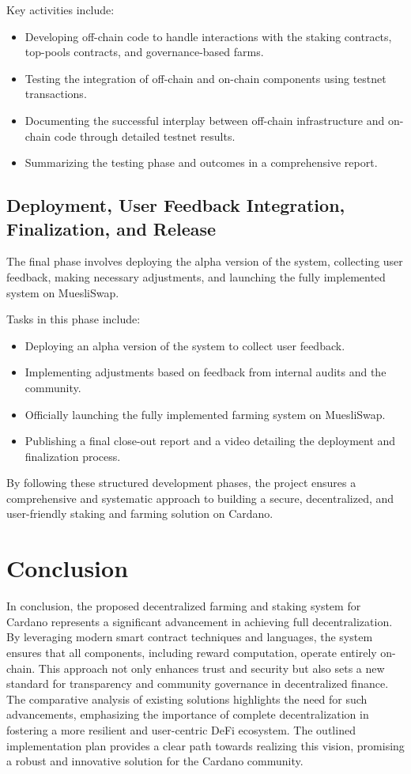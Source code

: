 \documentclass[12pt,parskip=full, tikz]{article}
\begin{document}
Key activities include:
\begin{itemize}
    \item Developing off-chain code to handle interactions with the staking contracts, top-pools contracts, and governance-based farms.
    \item Testing the integration of off-chain and on-chain components using testnet transactions.
    \item Documenting the successful interplay between off-chain infrastructure and on-chain code through detailed testnet results.
    \item Summarizing the testing phase and outcomes in a comprehensive report.
\end{itemize}

\subsection{Deployment, User Feedback Integration, Finalization, and Release}
The final phase involves deploying the alpha version of the system, collecting user feedback, making necessary adjustments, and launching the fully implemented system on MuesliSwap.

Tasks in this phase include:
\begin{itemize}
    \item Deploying an alpha version of the system to collect user feedback.
    \item Implementing adjustments based on feedback from internal audits and the community.
    \item Officially launching the fully implemented farming system on MuesliSwap.
    \item Publishing a final close-out report and a video detailing the deployment and finalization process.
\end{itemize}

By following these structured development phases, the project ensures a comprehensive and systematic approach to building a secure, decentralized, and user-friendly staking and farming solution on Cardano.


\section{Conclusion}
In conclusion, the proposed decentralized farming and staking system for Cardano represents a significant advancement in achieving full decentralization. By leveraging modern smart contract techniques and languages, the system ensures that all components, including reward computation, operate entirely on-chain. This approach not only enhances trust and security but also sets a new standard for transparency and community governance in decentralized finance. The comparative analysis of existing solutions highlights the need for such advancements, emphasizing the importance of complete decentralization in fostering a more resilient and user-centric DeFi ecosystem. The outlined implementation plan provides a clear path towards realizing this vision, promising a robust and innovative solution for the Cardano community.
\end{document}
